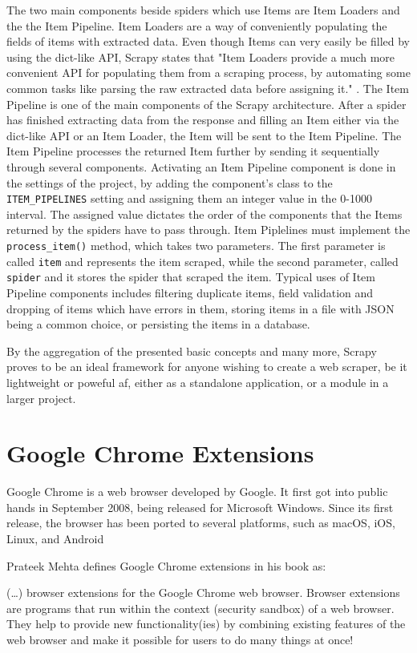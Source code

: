 \documentclass[12pt,a4paper,twoside]{report}
\begin{document}
The two main components beside spiders which use Items are Item Loaders and the the Item Pipeline. Item Loaders are a way of conveniently populating the fields of items with extracted data. Even though Items can very easily be filled by using the dict-like API, Scrapy states that "Item Loaders provide a much more convenient API for populating them from a scraping process, by automating some common tasks like parsing the raw extracted data before assigning it." \cite{scrapy_docs}. The Item Pipeline is one of the main components of the Scrapy architecture. After a spider has finished extracting data from the response and filling an Item either via the dict-like API or an Item Loader, the Item will be sent to the Item Pipeline. The Item Pipeline processes the returned Item further by sending it sequentially through several components. Activating an Item Pipeline component is done in the settings of the project, by adding the component's class to the \lstinline$ITEM_PIPELINES$ setting and assigning them an integer value in the 0-1000 interval. The assigned value dictates the order of the components that the Items returned by the spiders have to pass through. Item Piplelines must implement the \lstinline$process_item()$ method, which takes two parameters. The first parameter is called \lstinline$item$ and represents the item scraped, while the second parameter, called \lstinline$spider$ and it stores the spider that scraped the item. Typical uses of Item Pipeline components includes filtering duplicate items, field validation and dropping of items which have errors in them, storing items in a file with JSON being a common choice, or persisting the items in a database.

By the aggregation of the presented basic concepts and many more, Scrapy proves to be an ideal framework for anyone wishing to create a web scraper, be it lightweight or poweful af, either as a standalone application, or a module in a larger project.


\section{Google Chrome Extensions}

Google Chrome is a web browser developed by Google. It first got into public hands in September 2008, being released for Microsoft Windows. Since its first release, the browser has been ported to several platforms, such as macOS, iOS, Linux, and Android

Prateek Mehta defines Google Chrome extensions in his book \cite{creating_google_chrome_extensions} as:
\begin{displayquote}
  (\dots) browser extensions for the Google Chrome web browser.
  Browser extensions are programs that run within the context (security sandbox) of a web
  browser. They help to provide new functionality(ies) by combining existing features of the
  web browser and make it possible for users to do many things at once!
\end{displayquote}
\end{document}
